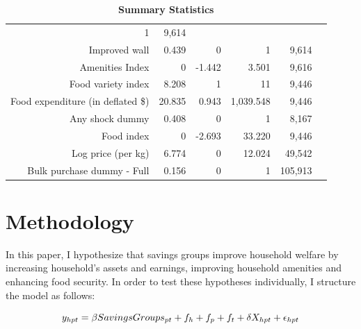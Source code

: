 \documentclass[12pt]{article}
\begin{document}
{\begin{table}[!h]
\begin{tabular}{llllll}
  \multicolumn{1}{|r}{1} &
  \multicolumn{1}{|r|}{9,614} \\
\multicolumn{1}{|r}{Improved wall} &
  \multicolumn{1}{|r}{0.439} &
  \multicolumn{1}{|r}{0} &
  \multicolumn{1}{|r}{1} &
  \multicolumn{1}{|r|}{9,614} \\
\multicolumn{1}{|r}{Amenities Index} &
  \multicolumn{1}{|r}{0} &
  \multicolumn{1}{|r}{-1.442} &
  \multicolumn{1}{|r}{3.501} &
  \multicolumn{1}{|r|}{9,616} \\
\multicolumn{1}{|r}{Food variety index} &
  \multicolumn{1}{|r}{8.208} &
  \multicolumn{1}{|r}{1} &
  \multicolumn{1}{|r}{11} &
  \multicolumn{1}{|r|}{9,446} \\
\multicolumn{1}{|r}{Food expenditure (in deflated \$)} &
  \multicolumn{1}{|r}{20.835} &
  \multicolumn{1}{|r}{0.943} &
  \multicolumn{1}{|r}{1,039.548} &
  \multicolumn{1}{|r|}{9,446} \\
\multicolumn{1}{|r}{Any shock dummy} &
  \multicolumn{1}{|r}{0.408} &
  \multicolumn{1}{|r}{0} &
  \multicolumn{1}{|r}{1} &
  \multicolumn{1}{|r|}{8,167}\\
\multicolumn{1}{|r}{Food index} &
  \multicolumn{1}{|r}{0} &
  \multicolumn{1}{|r}{-2.693} &
  \multicolumn{1}{|r}{33.220} &
  \multicolumn{1}{|r|}{9,446}\\
\multicolumn{1}{|r}{Log price (per kg)} &
  \multicolumn{1}{|r}{6.774} &
  \multicolumn{1}{|r}{0} &
  \multicolumn{1}{|r}{12.024} &
  \multicolumn{1}{|r|}{49,542} \\
\multicolumn{1}{|r}{Bulk purchase dummy - Full} &
  \multicolumn{1}{|r}{0.156} &
  \multicolumn{1}{|r}{0} &
  \multicolumn{1}{|r}{1} &
  \multicolumn{1}{|r|}{105,913}  \\
\cline{1-5}
\end{tabular}
\caption{\bfseries Summary Statistics}
\label{table:summary statistics}
\end{table}


\clearpage

\section{Methodology}\label{sec:Methodology} 
\hspace{1cm} In this paper, I hypothesize that savings groups improve household welfare by increasing household’s assets and earnings, improving household amenities and enhancing food security. In order to test these hypotheses individually, I structure the model as follows: 

\boldmath
\begin{equation}
y_{hpt} = \beta SavingsGroups_{pt}\\
  + f_h + f_p + f_t   + \delta X_{hpt} + \epsilon_{hpt}\\
\end{equation}
\unboldmath

}
\end{document}
